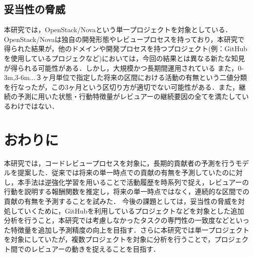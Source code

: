 \documentclass[submit,techrep,noauthor]{ipsj}
\begin{document}
\subsection{妥当性の脅威}
本研究では，OpenStack/Novaという単一プロジェクトを対象としている．OpenStack/Novaは独自の開発形態やレビュープロセスを持っており，本研究で得られた結果が，他のドメインや開発プロセスを持つプロジェクト(例：GitHubを使用しているプロジェクなど)においては，今回の結果とは異なる新たな知見が得られる可能性がある．しかし，大規模かつ長期間運用されている
また，0-3m,3-6m...３ヶ月単位で指定した将来の区間における活動の有無という二値分類を行なったが，この3ヶ月という区切り方が適切でない可能性がある．また，継続の予測に用いた状態・行動特徴量がレビュアーの継続要因の全てを満たしているわけではない．

\section{おわりに}
\label{sec:conclusion}
本研究では，コードレビュープロセスを対象に，長期的貢献者の予測を行うモデルを提案した．従来では将来の単一時点での貢献の有無を予測していたのに対し，本手法は逆強化学習を用いることで活動履歴を時系列で捉え，レビュアーの行動を説明する報酬関数を推定し，将来の単一時点ではなく，連続的な区間での貢献の有無を予測することを試みた．
 今後の課題としては，妥当性の脅威を対処していくために，GitHubを利用しているプロジェクトなどを対象とした追加分析を行うこと，本研究では考慮しなかったタスクの専門性の一致度などといった特徴量を追加し予測精度の向上を目指す．さらに本研究では単一プロジェクトを対象にしていたが，複数プロジェクトを対象に分析を行うことで，プロジェクト間でのレビュアーの動きを捉えることを目指す．




\end{document}
